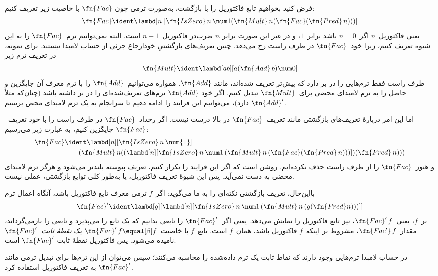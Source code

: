 \documentclass[../../../include/open-logic-section]{subfiles}
\begin{document}


فرض کنید بخواهیم تابع فاکتوریل را با بازگشت، به‌صورت ترمی چون
$\fn{Fac}$ با خاصیت زیر تعریف کنیم:
\[
\fn{Fac} \ident \lambd[n][\fn{IsZero}\, n\, \num 1 (\fn{Mult}\, n (\fn{Fac}(\fn{Pred} \, n)))]
\]
یعنی فاکتوریل~$n$ اگر~$n = 0$ باشد برابر~$1$، و در غیر این صورت برابر
$n$ ضرب‌در فاکتوریل~$n-1$ است. البته نمی‌توانیم ترم~$\fn{Fac}$ را به
این شیوه تعریف کنیم، زیرا خود~$\fn{Fac}$ در طرف راست رخ می‌دهد. چنین
تعریف‌های بازگشتیِ خودارجاع جزئی از حساب لامبدا نیستند. برای نمونه، در
تعریف ترم زیر
\[
\fn{Mult} \ident \lambd[ab][a (\fn{Add}\, b) \num 0]
\]
طرف راست فقط ترم‌هایی را در بر دارد که پیش‌تر تعریف شده‌اند، مانند
$\fn{Add}$. همواره می‌توانیم~$\fn{Add}$ را با ترم معرف آن جایگزین و
حاصل را به ترم لامبدای محضی برای~$\fn{Mult}$ تبدیل کنیم. اگر خود
$\fn{Add}$ ترم‌های تعریف‌شده‌ای را در بر داشته باشد (چنان‌که مثلاً
$\fn{Add}'$ دارد)، می‌توانیم این فرایند را ادامه دهیم تا سرانجام به یک
ترم لامبدای محض برسیم.

اما این امر دربارهٔ تعریف‌های بازگشتی مانند تعریف~$\fn{Fac}$ در بالا
درست نیست. اگر رخداد~$\fn{Fac}$ در طرف راست را با خود تعریف~$\fn{Fac}$
جایگزین کنیم، به عبارت زیر می‌رسیم:
\begin{align*}
  \fn{Fac} & \ident \lambd[n][\fn{IsZero}\, n\, \num{1}] \\
    & \qquad (\fn{Mult}\, n
  ((\lambd[n][\fn{IsZero} \, n \, \num 1\, (\fn{Mult}\, n\, (\fn{Fac}
    (\fn{Pred}\, n)))]) (\fn{Pred}\, n)))
\end{align*}
و هنوز~$\fn{Fac}$ را از طرف راست حذف نکرده‌ایم. روشن است که اگر این
فرایند را تکرار کنیم، تعریف پیوسته بلندتر می‌شود و هرگز ترم لامبدای
محضی به دست نمی‌آید. پس این شیوهٔ تعریف فاکتوریل، یا به‌طور کلی توابع
بازگشتی، عملی نیست.

بااین‌حال، تعریف بازگشتی نکته‌ای را به ما می‌گوید: اگر~$f$ ترمی معرف
تابع فاکتوریل باشد، آنگاه اعمال ترم
\[
\fn{Fac}' \ident \lambd[g][\lambd[n][\fn{IsZero} \, n \, \num 1\, (\fn{Mult} \, n\, (g (\fn{Pred} n)))]]
\]
بر~$f$، یعنی~$\fn{Fac}'\,f$، نیز تابع فاکتوریل را نمایش می‌دهد. یعنی
اگر~$\fn{Fac}'$ را تابعی بدانیم که یک تابع را می‌پذیرد و تابعی را
بازمی‌گرداند، مقدار~$\fn{Fac'}\, f$، مشروط بر اینکه~$f$ فاکتوریل باشد،
همان~$f$ است. تابع~$f$ با خاصیت~$\fn{Fac}' \, f \equal[\beta] f$ یک
\emph{نقطهٔ ثابت}~$\fn{Fac}'$ نامیده می‌شود. پس فاکتوریل نقطهٔ ثابت
$\fn{Fac}'$ است.

در حساب لامبدا ترم‌هایی وجود دارند که نقاط ثابت یک ترم داده‌شده را
محاسبه می‌کنند؛ سپس می‌توان از این ترم‌ها برای تبدیل ترمی مانند
$\fn{Fac}'$ به تعریف فاکتوریل استفاده کرد.
\end{document}
